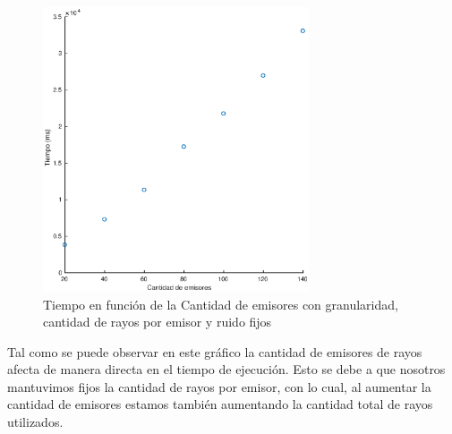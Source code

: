 \begin{figure}[H]
	\centering	\includegraphics[width=0.7\textwidth]{img/emi_tiempo}
	\caption{Tiempo en función de la Cantidad de emisores con granularidad, cantidad de rayos por emisor y ruido fijos}
	\label{fig:emi_tiempo}
\end{figure}
\par Tal como se puede observar en este gr\'afico la cantidad de emisores de rayos afecta de manera directa en el tiempo de ejecuci\'on. Esto se debe a que nosotros mantuvimos fijos la cantidad de rayos por emisor, con lo cual, al aumentar
la cantidad de emisores estamos tambi\'en aumentando la cantidad total de rayos utilizados.

